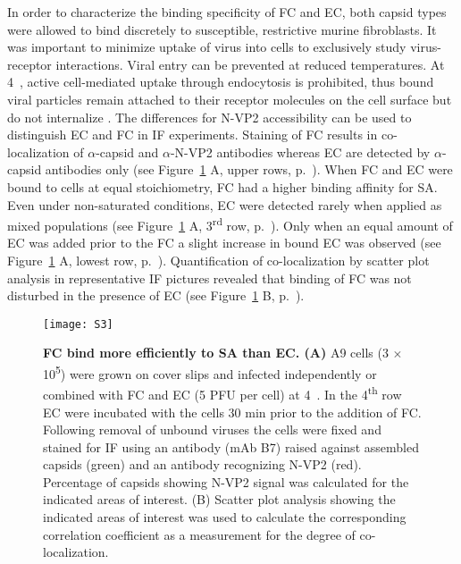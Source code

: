 In order to characterize the binding specificity of FC and EC, both capsid types were allowed to bind discretely to susceptible, restrictive murine fibroblasts. It was important to minimize uptake of virus into cells to exclusively study virus-receptor interactions. Viral entry can be prevented at reduced temperatures. At \mbox{4~\textcelsius}, active cell-mediated uptake through endocytosis is prohibited, thus bound viral particles remain attached to their receptor molecules on the cell surface but do not internalize \cite{pmid20517}. The differences for N-VP2 accessibility can be used to distinguish EC and FC in IF experiments. Staining of FC results in co-localization of $\alpha$-capsid and $\alpha$-N-VP2 antibodies whereas EC are detected by $\alpha$-capsid antibodies only (see Figure~\ref{S3} A, upper rows, p.~\pageref{S3}). When FC and EC were bound to cells at equal stoichiometry, FC had a higher binding affinity for SA. Even under non-saturated conditions, EC were detected rarely when applied as mixed populations (see Figure~\ref{S3} A, 3\textsuperscript{rd} row, p.~\pageref{S3}). Only when an equal amount of EC was added prior to the FC a slight increase in bound EC was observed (see Figure~\ref{S3} A, lowest row, p.~\pageref{S3}). Quantification of co-localization by scatter plot analysis in representative IF pictures revealed that binding of FC was not disturbed in the presence of EC (see Figure~\ref{S3} B, p.~\pageref{S3}).             








\begin{figure}
\centering
  \texttt{[image: S3]} \\[0.35 cm]
  \caption[Full Capsids Bind More Efficiently to Sialic Acid than Empty Capsids]
   {\textbf{FC bind more efficiently to SA than EC. (A)} A9 cells (3 $\times$ 10\textsuperscript{5}) were grown on cover slips and infected independently or combined with FC and EC (5 PFU per cell) at \mbox{4 \textcelsius}. In the 4\textsuperscript{th} row EC were incubated with the cells 30 min prior to the addition of FC. Following removal of unbound viruses the cells were fixed and stained for IF using an antibody (mAb B7) raised against assembled capsids (green) and an antibody recognizing N-VP2 (red). Percentage of capsids showing N-VP2 signal was calculated for the indicated areas of interest. (B) Scatter plot analysis showing the indicated areas of interest was used to calculate the corresponding correlation coefficient as a measurement for the degree of co-localization.} 
\label{S3}
\end{figure}



